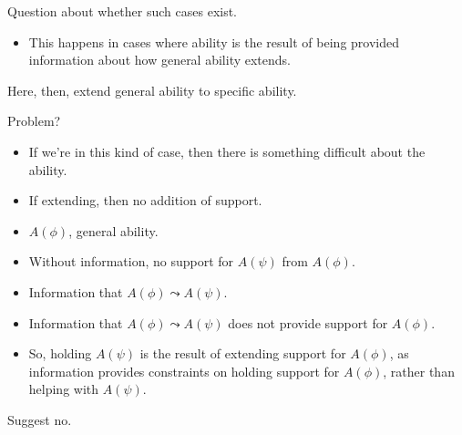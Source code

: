 Question about whether such cases exist.

\begin{itemize}
\item This happens in cases where ability is the result of being provided information about how general ability extends.
\end{itemize}

Here, then, extend general ability to specific ability.

Problem?

\begin{itemize}
\item If we're in this kind of case, then there is something difficult about the ability.
\end{itemize}

\begin{itemize}
\item If extending, then no addition of support.
\end{itemize}

\begin{itemize}
\item \(A(\phi)\), general ability.
\item Without information, no support for \(A(\psi)\) from \(A(\phi)\).
\item Information that \(A(\phi) \leadsto A(\psi)\).
\item Information that \(A(\phi) \leadsto A(\psi)\) does not provide support for \(A(\phi)\).
\item So, holding \(A(\psi)\) is the result of extending support for \(A(\phi)\), as information provides constraints on holding support for \(A(\phi)\), rather than helping with \(A(\psi)\).
\end{itemize}


Suggest no.
